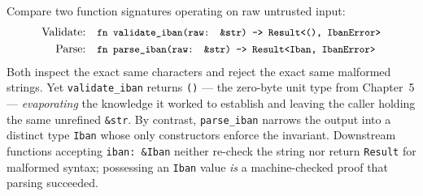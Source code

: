 \begin{definition}
Compare two function signatures operating on raw untrusted input:
\begin{align*}
  \text{Validate:} &\quad \texttt{\small fn validate\_iban(raw: \&str) -> Result<(), IbanError>} \\
  \text{Parse:}    &\quad \texttt{\small fn parse\_iban(raw: \&str) -> Result<Iban, IbanError>}
\end{align*}
Both inspect the exact same characters and reject the exact same malformed strings. Yet \texttt{validate\_\allowbreak{}iban} returns \texttt{()} --- the zero-byte unit type from Chapter~5 --- \emph{evaporating} the knowledge it worked to establish and leaving the caller holding the same unrefined \texttt{\&str}. By contrast, \texttt{parse\_\allowbreak{}iban} narrows the output into a distinct type \texttt{Iban} whose only constructors enforce the invariant. Downstream functions accepting \texttt{iban:\allowbreak\ \&Iban} neither re-check the string nor return \texttt{Result} for malformed syntax; possessing an \texttt{Iban} value \emph{is} a machine-checked proof that parsing succeeded.
\end{definition}

